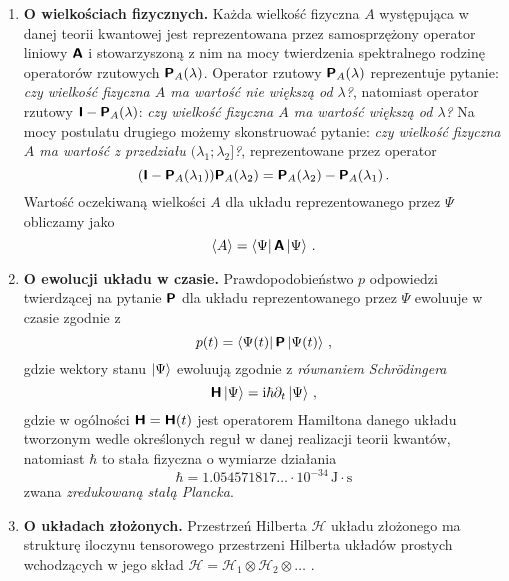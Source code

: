 \documentclass{myclass}
\begin{document}
\begin{enumerate}[label=\Roman*.]
    \item \textbf{O wielkościach fizycznych.} Każda wielkość fizyczna \(A\) występująca w danej
    teorii kwantowej jest reprezentowana przez samosprzężony operator liniowy \(\boldsymbol{\mathsf{A}}\) i
    stowarzyszoną z nim na mocy twierdzenia spektralnego rodzinę operatorów rzutowych
    \(\boldsymbol{\mathsf{P}}_A(\lambda)\). Operator rzutowy \(\boldsymbol{\mathsf{P}}_A(\lambda)\) reprezentuje pytanie:
    \textit{czy wielkość fizyczna \(A\) ma wartość nie większą od \(\lambda\)?}, natomiast operator
    rzutowy \(\boldsymbol{\mathsf{I}}-\boldsymbol{\mathsf{P}}_A(\lambda)\): \textit{czy wielkość fizyczna \(A\) ma wartość większą
    od \(\lambda\)?} Na mocy postulatu drugiego możemy skonstruować pytanie: \textit{czy wielkość
    fizyczna \(A\) ma wartość z przedziału \((\lambda_1;\lambda_2]\)?}, reprezentowane przez
    operator 
    \begin{equation*}
        (\boldsymbol{\mathsf{I}} - \boldsymbol{\mathsf{P}}_A(\lambda_1))\boldsymbol{\mathsf{P}}_A(\lambda_2) =
        \boldsymbol{\mathsf{P}}_A(\lambda_2)-\boldsymbol{\mathsf{P}}_A(\lambda_1)\,.
    \end{equation*}
    Wartość oczekiwaną wielkości \(A\) dla układu reprezentowanego przez \(\Psi\) obliczamy jako
    \begin{equation*}
        \langle A \rangle = \bra{\Psi}\boldsymbol{\mathsf{A}}\ket{\Psi}\,.
    \end{equation*}

    \item \textbf{O ewolucji układu w czasie.} Prawdopodobieństwo \(p\) odpowiedzi twierdzącej na
    pytanie \(\boldsymbol{\mathsf{P}}\) dla układu reprezentowanego przez \(\Psi\) ewoluuje w czasie zgodnie z
    \begin{equation*}
        p(t) = \bra{\Psi(t)}\boldsymbol{\mathsf{P}}\ket{\Psi(t)}\,,
    \end{equation*}
    gdzie wektory stanu \(\ket{\Psi}\) ewoluują zgodnie z \textit{równaniem Schr\"{o}dingera}
    \begin{equation*}
        \boldsymbol{\mathsf{H}}\ket{\Psi} = \mathrm{i}\hbar\partial_t\ket{\Psi}\,,
    \end{equation*}
    gdzie w ogólności \(\boldsymbol{\mathsf{H}} = \boldsymbol{\mathsf{H}}(t)\) jest operatorem Hamiltona danego układu tworzonym
    wedle określonych reguł w danej realizacji teorii kwantów, natomiast \(\hbar\) to stała fizyczna
    o wymiarze działania
    \begin{equation*}
        \hbar = 1.054571817\ldots \cdot 10^{-34}\,\text{J}\cdot\text{s}
    \end{equation*}
    zwana \textit{zredukowaną stałą Plancka}.
    
    \item \textbf{O układach złożonych.} Przestrzeń Hilberta \(\mathscr{H}\) układu złożonego ma
    strukturę iloczynu tensorowego przestrzeni Hilberta układów prostych wchodzących w jego skład
    \(\mathscr{H}=\mathscr{H}_1\otimes\mathscr{H}_2\otimes\ldots\) .

\end{enumerate}
\end{document}
